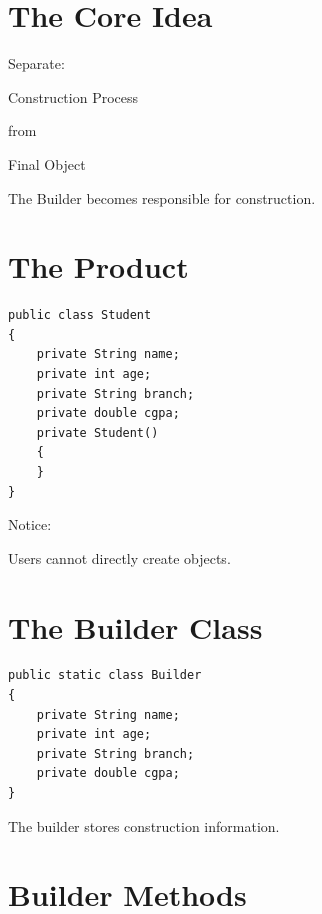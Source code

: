 \documentclass[11pt,a4paper]{book}
\begin{document}
\section{The Core Idea}

\begin{idea}

Separate:

\begin{center}
Construction Process
\end{center}

from

\begin{center}
Final Object
\end{center}

\end{idea}

The Builder becomes responsible for construction.


\section{The Product}

\begin{verbatim}
public class Student
{
    private String name;
    private int age;
    private String branch;
    private double cgpa;
    private Student()
    {
    }
}
\end{verbatim}

Notice:

Users cannot directly create objects.


\section{The Builder Class}

\begin{verbatim}
public static class Builder
{
    private String name;
    private int age;
    private String branch;
    private double cgpa;
}
\end{verbatim}

The builder stores construction information.


\section{Builder Methods}
\end{document}
